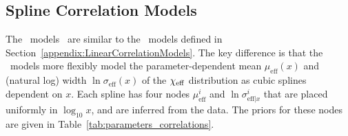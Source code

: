 \subsection{Spline Correlation Models}\label{appendix:SplineCorrelationModels}
The \splinecorrelation~models~\citep{Heinzel:2023hlb} are similar to the \linearcorrelation~models defined in Section~\ref{appendix:LinearCorrelationModels}.
The key difference is that the \splinecorrelation~models more flexibly model the parameter-dependent mean $\mu_\mathrm{eff}(x)$ and (natural log) width $\ln \sigma_\mathrm{eff}(x)$ of the $\chi_{\rm eff}$ distribution as cubic splines dependent on $x$.
Each spline has four nodes $\mu_\mathrm{eff}^i$ and $\ln \sigma_{\mathrm{eff}|x}^i$ that are placed uniformly in $\log_{10} x$, and are inferred from the data.
The priors for these nodes are given in Table~\ref{tab:parameters_correlations}.
